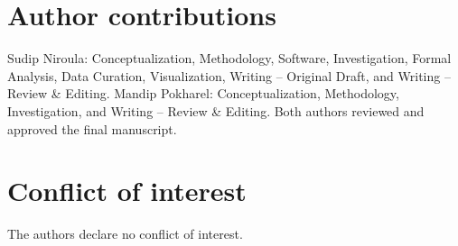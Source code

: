 \section{Author contributions}
\label{sec:contributions}

Sudip Niroula: Conceptualization, Methodology, Software, Investigation, Formal Analysis, Data Curation, Visualization, Writing -- Original Draft, and Writing -- Review \& Editing. Mandip Pokharel: Conceptualization, Methodology, Investigation, and Writing -- Review \& Editing. Both authors reviewed and approved the final manuscript.

\section{Conflict of interest}
\label{sec:coi}

The authors declare no conflict of interest.
